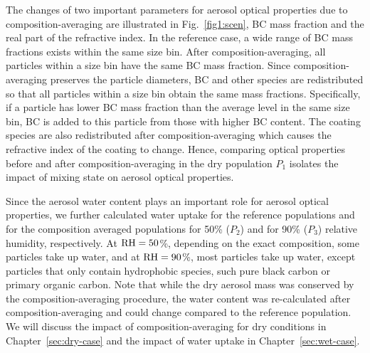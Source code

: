 \documentclass[edeposit,fullpage]{uiucthesis2009}
\begin{document}
The changes of two important parameters for aerosol optical properties
due to composition-averaging are illustrated in Fig.~\ref{fig1:scen},
BC mass fraction and the real part of the refractive index. In the
reference case, a wide range of BC mass fractions exists within the
same size bin. After composition-averaging, all particles within a
size bin have the same BC mass fraction.  Since composition-averaging
preserves the particle diameters, BC and other species are
redistributed so that all particles within a size bin obtain the same
mass fractions. Specifically, if a particle has lower BC mass fraction
than the average level in the same size bin, BC is added to this
particle from those with higher BC content. The coating species are
also redistributed after composition-averaging which causes the
refractive index of the coating to change. Hence, comparing optical
properties before and after composition-averaging in the dry
population $P_1$ isolates the impact of mixing state on aerosol
optical properties.


Since the aerosol water content plays an important role for aerosol
optical properties, we further calculated water uptake for the
reference populations and for the composition averaged populations for
50\% ($P_2$) and for 90\% ($P_3$) relative humidity, respectively.  At
$\rm RH = 50$\%, depending on the exact composition, some particles
take up water, and at $\rm RH = 90$\%, most particles take up water,
except particles that only contain hydrophobic species, such pure
black carbon or primary organic carbon. Note that while the dry
aerosol mass was conserved by the composition-averaging procedure, the
water content was re-calculated after composition-averaging and could
change compared to the reference population. We will discuss the
impact of composition-averaging for dry conditions in
Chapter~\ref{sec:dry-case} and the impact of water uptake in
Chapter~\ref{sec:wet-case}.
\end{document}
